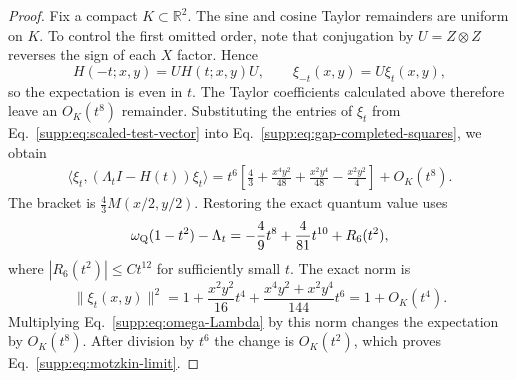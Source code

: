\documentclass[aps,prl,onecolumn,10pt,superscriptaddress,nofootinbib,longbibliography]{revtex4-2}
\theoremstyle{remark}
\newcommand{\R}{\mathbb R}
\begin{document}
\begin{proof}
Fix a compact $K\subset\R^2$. The sine and cosine Taylor remainders are uniform on $K$. To control the first omitted order, note that conjugation by $U=Z\otimes Z$ reverses the sign of each $X$ factor. Hence
\begin{equation}
H(-t;x,y)=UH(t;x,y)U,
\qquad
\xi_{-t}(x,y)=U\xi_t(x,y),
\label{supp:eq:t-evenness}
\end{equation}
so the expectation is even in $t$. The Taylor coefficients calculated above therefore leave an $O_K(t^8)$ remainder. Substituting the entries of $\xi_t$ from Eq.~\eqref{supp:eq:scaled-test-vector} into Eq.~\eqref{supp:eq:gap-completed-squares}, we obtain
\begin{align}
\langle\xi_t,(\Lambda_tI-H(t))\xi_t\rangle
=t^6\left[
\frac43+\frac{x^4y^2}{48}+\frac{x^2y^4}{48}-\frac{x^2y^2}{4}
\right]+O_K(t^8).
\label{supp:eq:motzkin-leading-term}
\end{align}
The bracket is $\frac43M(x/2,y/2)$. Restoring the exact quantum value uses
\begin{equation}
\omega_{\rm Q}(1-t^2)-\Lambda_t
=-\frac49t^8+\frac4{81}t^{10}+R_6(t^2),
\label{supp:eq:omega-Lambda}
\end{equation}
where $|R_6(t^2)|\leq Ct^{12}$ for sufficiently small $t$. The exact norm is
\begin{equation}
\|\xi_t(x,y)\|^2
=1+\frac{x^2y^2}{16}t^4+\frac{x^4y^2+x^2y^4}{144}t^6
=1+O_K(t^4).
\label{supp:eq:test-vector-norm}
\end{equation}
Multiplying Eq.~\eqref{supp:eq:omega-Lambda} by this norm changes the expectation by $O_K(t^8)$. After division by $t^6$ the change is $O_K(t^2)$, which proves Eq.~\eqref{supp:eq:motzkin-limit}.
\end{proof}
\end{document}
